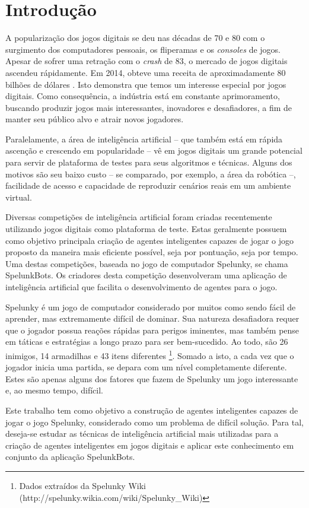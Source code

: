 \chapter{\label{chap:intro}Introdução}
A popularização dos jogos digitais se deu nas décadas de 70 e 80 com o
surgimento dos computadores pessoais, os fliperamas e os \textit{consoles}
de jogos. Apesar de sofrer uma retração com o \textit{crash} de 83, o mercado 
de jogos digitais ascendeu rápidamente. Em 2014, obteve uma receita de
aproximadamente 80 bilhões de dólares \cite{VIDEOGAMEREVENUE}. Isto demonstra
que temos um interesse especial por jogos digitais. Como consequência, a
indústria está em constante aprimoramento, buscando produzir jogos mais
interessantes, inovadores e desafiadores, a fim de manter seu público alvo e
atrair novos jogadores.

Paralelamente, a área de inteligência artificial -- que também está em rápida
ascenção e crescendo em popularidade -- vê em jogos digitais um grande
potencial para servir de plataforma de testes para seus algoritmos e técnicas.
Alguns dos motivos são seu baixo custo -- se comparado, por exemplo, a área da
robótica --, facilidade de acesso e capacidade de reproduzir cenários reais em
um ambiente virtual.

Diversas competições de inteligência artificial foram criadas recentemente
utilizando jogos digitais como plataforma de teste. Estas geralmente possuem
como objetivo principala criação de agentes inteligentes capazes de jogar o
jogo proposto da maneira mais eficiente possível, seja por pontuação, seja por
tempo. Uma destas competições, baseada no jogo de computador Spelunky, se chama
SpelunkBots. Os criadores desta competição desenvolveram uma aplicação de
inteligência artificial que facilita o desenvolvimento de agentes para o jogo.

Spelunky é um jogo de computador considerado por muitos como sendo fácil de
aprender, mas extremamente difícil de dominar. Sua natureza desafiadora requer
que o jogador possua reações rápidas para perigos iminentes, mas também pense
em táticas e estratégias a longo prazo para ser bem-sucedido. Ao todo, são 26
inimigos, 14 armadilhas e 43 itens diferentes \footnote{Dados extraídos da
Spelunky Wiki (http://spelunky.wikia.com/wiki/Spelunky\_Wiki)}. Somado a isto, a
cada vez que o jogador inicia uma partida, se depara com um nível completamente
diferente. Estes são apenas alguns dos fatores que fazem de Spelunky um jogo
interessante e, ao mesmo tempo, difícil.

Este trabalho tem como objetivo a construção de agentes inteligentes capazes de
jogar o jogo Spelunky, considerado como um problema de difícil solução. Para
tal, deseja-se estudar as técnicas de inteligência artificial mais utilizadas
para a criação de agentes inteligentes em jogos digitais e aplicar este
conhecimento em conjunto da aplicação SpelunkBots.
